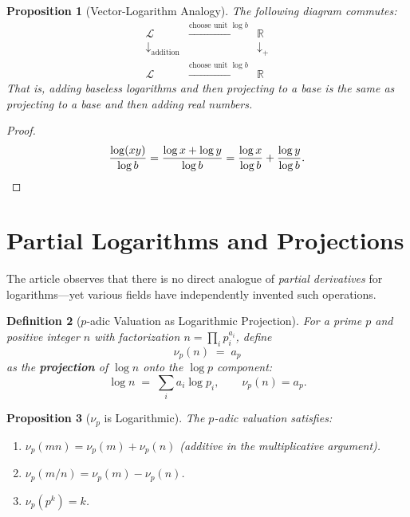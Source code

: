 \documentclass[11pt]{article}
\newtheorem{definition}{Definition}[section]
\newtheorem{proposition}[definition]{Proposition}
\begin{document}
\begin{proposition}[Vector-Logarithm Analogy]
\label{prop:vector-analogy}
The following diagram commutes:
\[
\begin{array}{ccc}
\mathcal{L} & \xrightarrow{\text{choose unit } \log b} & \mathbb{R} \\
\downarrow_{\text{addition}} & & \downarrow_{+} \\
\mathcal{L} & \xrightarrow{\text{choose unit } \log b} & \mathbb{R}
\end{array}
\]
That is, adding baseless logarithms and then projecting to a base is the same as projecting to a base and then adding real numbers.
\end{proposition}

\begin{proof}
\[
\frac{\log(xy)}{\log b} = \frac{\log x + \log y}{\log b} = \frac{\log x}{\log b} + \frac{\log y}{\log b}. \qedhere
\]
\end{proof}

\section{Partial Logarithms and Projections}
\label{sec:partial}

The article observes that there is no direct analogue of \emph{partial derivatives} for logarithms---yet various fields have independently invented such operations.

\begin{definition}[$p$-adic Valuation as Logarithmic Projection]
\label{def:padic}
For a prime $p$ and positive integer $n$ with factorization $n = \prod_i p_i^{a_i}$, define
\[
\nu_p(n) \;=\; a_p
\]
as the \textbf{projection} of $\log n$ onto the $\log p$ component:
\[
\log n \;=\; \sum_i a_i \log p_i, \qquad \nu_p(n) = a_p.
\]
\end{definition}

\begin{proposition}[$\nu_p$ is Logarithmic]
\label{prop:nulog}
The $p$-adic valuation satisfies:
\begin{enumerate}
\item $\nu_p(mn) = \nu_p(m) + \nu_p(n)$ (additive in the multiplicative argument).
\item $\nu_p(m/n) = \nu_p(m) - \nu_p(n)$.
\item $\nu_p(p^k) = k$.
\end{enumerate}
\end{proposition}
\end{document}
